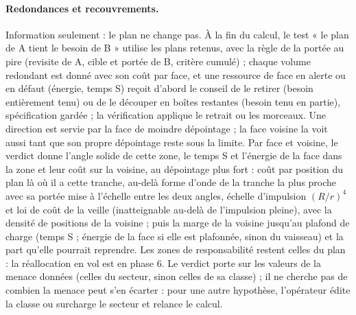 \documentclass[11pt,a4paper]{article}
\begin{document}
\paragraph{Redondances et recouvrements.} Information seulement : le plan ne change pas. À la fin du calcul, le test
« le plan de A tient le besoin de B » utilise les plans retenus, avec la règle de la portée
au pire (revisite de A, cible et portée de B, critère cumulé) ; chaque volume redondant est donné avec son coût par
face, et une ressource de face en alerte ou en défaut (énergie, temps S) reçoit d'abord le conseil de le retirer (besoin
entièrement tenu) ou de le découper en boîtes restantes (besoin tenu en partie), spécification gardée ; la vérification
applique le retrait ou les morceaux. Une direction est servie par la face de moindre dépointage ; la face voisine la
voit aussi tant que son propre dépointage reste sous la limite. Par face et voisine, le verdict donne l'angle solide de
cette zone, le temps S et l'énergie de la face dans la zone et leur coût sur la voisine, au dépointage plus fort : coût
par position du plan là où il a cette tranche, au-delà forme d'onde de la tranche la plus proche avec sa portée mise à
l'échelle entre les deux angles, échelle d'impulsion $(R/r)^4$ et loi de coût de la veille (inatteignable au-delà de
l'impulsion pleine), avec la densité de positions de la voisine ; puis la marge de la voisine jusqu'au plafond de charge
(temps S ; énergie de la face si elle est plafonnée, sinon du vaisseau) et la part qu'elle pourrait reprendre. Les zones
de responsabilité restent celles du plan : la réallocation en vol est en phase 6. Le verdict porte sur les
valeurs de la menace données (celles du secteur, sinon celles de sa classe) ; il ne cherche pas de combien la menace peut
s'en écarter : pour une autre hypothèse, l'opérateur édite la classe ou surcharge le secteur et relance le calcul.

\end{document}
